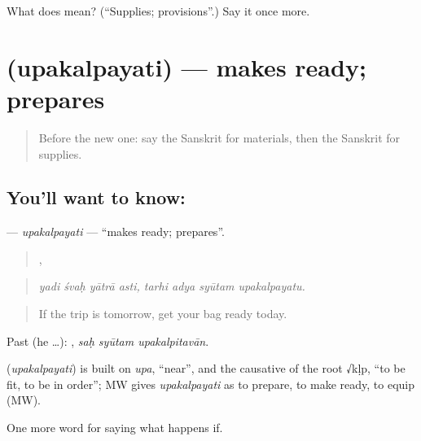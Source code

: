 \begin{tcolorbox}[breakable,colback=teal!4,colframe=teal!35!black,title={Before you move on}]
What does  mean? (\textquotedblleft{}Supplies; provisions\textquotedblright{}.) Say it once more.
\end{tcolorbox}
\section[\texorpdfstring{\sk{उपकल्पयति} (upakalpayati)}{उपकल्पयति (upakalpayati)}]{ (upakalpayati) — makes ready; prepares}

\label{lesson:SA-C528-upakalpayati}



\begin{quote}
Before the new one: say the Sanskrit for materials, then the Sanskrit for supplies.
\end{quote}

\subsection*{You'll want to know: }
\textbf{} — \emph{upakalpayati} — \textquotedblleft{}makes ready; prepares\textquotedblright{}.

\begin{quote}
   ,    
\end{quote}

\begin{quote}
\emph{yadi śvaḥ yātrā asti, tarhi adya syūtam upakalpayatu.}
\end{quote}

\begin{quote}
If the trip is tomorrow, get your bag ready today.
\end{quote}

Past (he …):   , \emph{saḥ syūtam upakalpitavān}.

\begin{cousinweb}
\textbf{} (\emph{upakalpayati}) is built on \emph{upa}, \textquotedblleft{}near\textquotedblright{}, and the causative of the root √kḷp, \textquotedblleft{}to be fit, to be in order\textquotedblright{}; MW gives \emph{upakalpayati} as to prepare, to make ready, to equip (MW).
\end{cousinweb}

\begin{grammarlens}[title={What you've built}]
One more word for saying what happens if.
\end{grammarlens}

